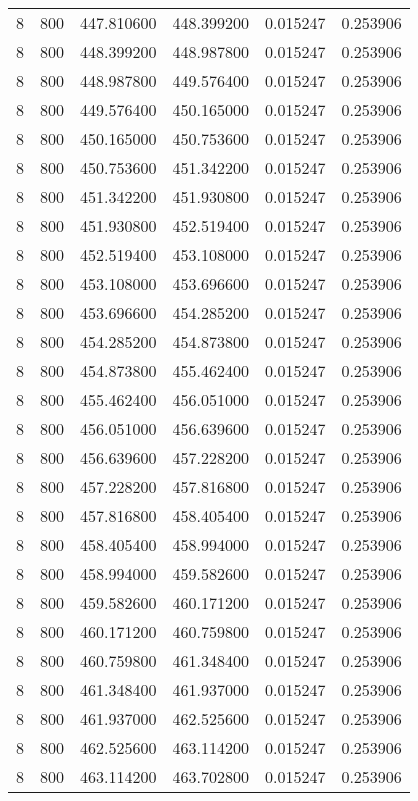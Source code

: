 \begin{longtable}{rrrrrr}
8 & 800 & 447.810600 & 448.399200 & 0.015247 & 0.253906 \\
8 & 800 & 448.399200 & 448.987800 & 0.015247 & 0.253906 \\
8 & 800 & 448.987800 & 449.576400 & 0.015247 & 0.253906 \\
8 & 800 & 449.576400 & 450.165000 & 0.015247 & 0.253906 \\
8 & 800 & 450.165000 & 450.753600 & 0.015247 & 0.253906 \\
8 & 800 & 450.753600 & 451.342200 & 0.015247 & 0.253906 \\
8 & 800 & 451.342200 & 451.930800 & 0.015247 & 0.253906 \\
8 & 800 & 451.930800 & 452.519400 & 0.015247 & 0.253906 \\
8 & 800 & 452.519400 & 453.108000 & 0.015247 & 0.253906 \\
8 & 800 & 453.108000 & 453.696600 & 0.015247 & 0.253906 \\
8 & 800 & 453.696600 & 454.285200 & 0.015247 & 0.253906 \\
8 & 800 & 454.285200 & 454.873800 & 0.015247 & 0.253906 \\
8 & 800 & 454.873800 & 455.462400 & 0.015247 & 0.253906 \\
8 & 800 & 455.462400 & 456.051000 & 0.015247 & 0.253906 \\
8 & 800 & 456.051000 & 456.639600 & 0.015247 & 0.253906 \\
8 & 800 & 456.639600 & 457.228200 & 0.015247 & 0.253906 \\
8 & 800 & 457.228200 & 457.816800 & 0.015247 & 0.253906 \\
8 & 800 & 457.816800 & 458.405400 & 0.015247 & 0.253906 \\
8 & 800 & 458.405400 & 458.994000 & 0.015247 & 0.253906 \\
8 & 800 & 458.994000 & 459.582600 & 0.015247 & 0.253906 \\
8 & 800 & 459.582600 & 460.171200 & 0.015247 & 0.253906 \\
8 & 800 & 460.171200 & 460.759800 & 0.015247 & 0.253906 \\
8 & 800 & 460.759800 & 461.348400 & 0.015247 & 0.253906 \\
8 & 800 & 461.348400 & 461.937000 & 0.015247 & 0.253906 \\
8 & 800 & 461.937000 & 462.525600 & 0.015247 & 0.253906 \\
8 & 800 & 462.525600 & 463.114200 & 0.015247 & 0.253906 \\
8 & 800 & 463.114200 & 463.702800 & 0.015247 & 0.253906 \\

\end{longtable}
